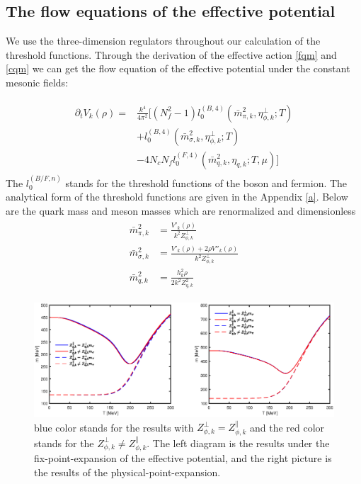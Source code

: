 \documentclass[%
reprint,
superscriptaddress,
showpacs,preprintnumbers,
 amsmath,amssymb,
 aps,
prd,
]{revtex4-1}
\begin{document}
\subsection{The flow equations of the effective potential}
We use the three-dimension regulators throughout our calculation of the threshold functions. 
Through the derivation of the effective action \ref{fqm} and \ref{cqm} we can get the flow equation of the effective potential under the 
constant mesonic fields:

\begin{align}
\begin{split}
\partial_tV_k(\rho)=&\frac{k^4}{4\pi^2}[(N^2_f-1)l^{(B,4)}_{0}(\bar{m}^{2}_{\pi,k},\eta^{\bot}_{\phi,k};T)\\
&+l^{(B,4)}_{0}(\bar{m}^{2}_{\sigma,k},\eta^{\bot}_{\phi,k};T)\\
&-4N_cN_fl^{(F,4)}_{0}(\bar{m}^{2}_{q,k},\eta_{q,k};T,\mu)]
\end{split}
\end{align}
The $l_0^{(B/F,n)}$ stands for the threshold functions of the boson and fermion. The analytical form of the threshold functions are 
given in the Appendix \ref{a}. Below are the quark mass and meson masses which are renormalized and dimensionless
\begin{align}
\begin{split}
\bar{m}^{2}_{\pi,k}&=\frac{V'_k(\rho)}{k^2Z^{\bot}_{\phi,k}}\\
\bar{m}^{2}_{\sigma,k}&=\frac{V'_k(\rho)+2\rho V''_k(\rho)}{k^2Z^{\bot}_{\phi,k}}\\
\bar{m}^{2}_{q,k}&=\frac{h^{2}_{k}\rho}{2k^2Z^{2}_{q,k}}
\end{split}
\end{align}
\begin{figure}[t]
\label{fig:mphi}
\includegraphics[width=1.0\textwidth]{mphi.eps}
\caption{blue color stands for the results with $Z^{\bot}_{\phi,k}=Z^{\|}_{\phi,k}$ and the red color stands for the $Z^{\bot}
_{\phi,k}\neq Z^{\|}_{\phi,k} $. The left diagram is the results under the fix-point-expansion of the effective potential, and 
the right picture is the results of the physical-point-expansion.}
\end{figure}
\end{document}

